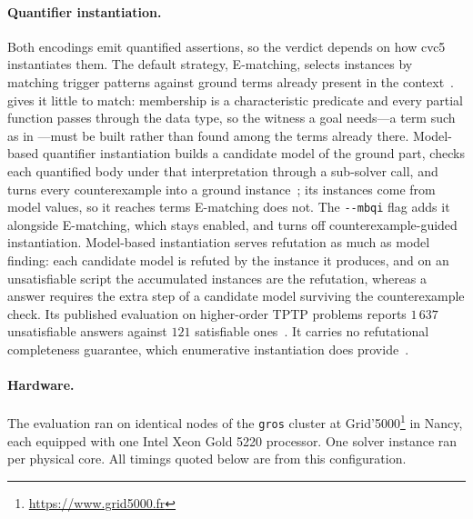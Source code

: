 \paragraph*{Quantifier instantiation.}
Both encodings emit quantified assertions, so the verdict depends on how cvc5 instantiates them.
The default strategy, E-matching, selects instances by matching trigger patterns against ground terms already present in the context~\cite{detlefs2005simplify}.
\beer{} gives it little to match: membership is a characteristic predicate and every partial function passes through the  data type, so the witness a goal needs---a term such as  in ---must be built rather than found among the terms already there.
Model-based quantifier instantiation builds a candidate model of the ground part, checks each quantified body under that interpretation through a sub-solver call, and turns every counterexample into a ground instance~\cite{ge2009complete,kondylidou2025mbqi}; its instances come from model values, so it reaches terms E-matching does not.
The \texttt{-{}-mbqi} flag adds it alongside E-matching, which stays enabled, and turns off counterexample-guided instantiation.
Model-based instantiation serves refutation as much as model finding: each candidate model is refuted by the instance it produces, and on an unsatisfiable script the accumulated instances are the refutation, whereas a  answer requires the extra step of a candidate model surviving the counterexample check.
Its published evaluation on higher-order TPTP problems reports \(1\,637\) unsatisfiable answers against \(121\) satisfiable ones~\cite{kondylidou2025mbqi}.
It carries no refutational completeness guarantee, which enumerative instantiation does provide~\cite{reynolds2018enumerative}.

\paragraph*{Hardware.}
The evaluation ran on identical nodes of the \texttt{gros} cluster at Grid'5000\footnote{\url{https://www.grid5000.fr}} in Nancy, each equipped with one Intel Xeon Gold 5220 processor.
One solver instance ran per physical core.
All timings quoted below are from this configuration.


